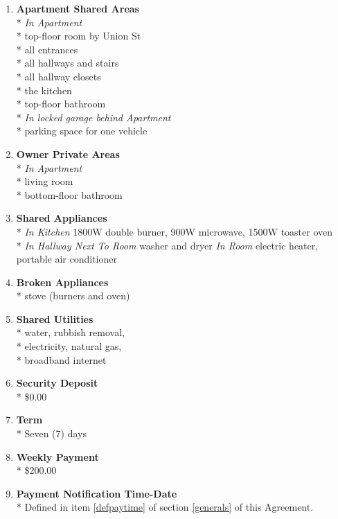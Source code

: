 \documentclass[12pt,letterpaper]{article}
\newcommand{\apt}{Apartment}
\newcommand{\room}{Room}
\newcommand{\shared}{Apartment Shared Areas}
\newcommand{\livingroom}{Owner Private Areas}
\newcommand{\appliances}{Shared Appliances}
\newcommand{\broken}{Broken Appliances}
\newcommand{\utilities}{Shared Utilities}
\newcommand{\deposit}{Security Deposit}
\newcommand{\rent}{Weekly Payment}
\newcommand{\paymenttime}{Payment Notification Time-Date}
\begin{document}
\begin{multicols}{2}
\begin{enumerate}
		\item \textbf{\shared{}}\\* \label{shared}
			\textit{In \apt{}}\\*
			top-floor room by Union St\\*
			all entrances\\*
			all hallways and stairs\\*
			all hallway closets\\*
			the kitchen\\*
			top-floor bathroom\\*
			\textit{In locked garage behind \apt{}}\\*
			parking space for one vehicle
			
		\item \textbf{\livingroom{}}\\* \label{livingroom}
			\textit{In \apt{}}\\*
			living room\\*
			bottom-floor bathroom
			
		\item \textbf{\appliances}\\* \label{appliances}
			\textit{In Kitchen} 1800W double burner,
			900W microwave,
			1500W toaster oven\\*
			\textit{In Hallway Next To \room{}} washer and dryer
			\textit{In \room{}} electric heater,
			portable air conditioner
			
		\item \textbf{\broken{}}\\* \label{broken}
			stove (burners and oven)

		\item \textbf{\utilities{}}\\* \label{utilities}
			water,
			rubbish removal,\\*
			electricity,
			natural gas,\\*
			broadband internet

		\item \textbf{\deposit{}}\\* \label{deposit}
			\$0.00

		\item \textbf{Term}\\*
			Seven (7) days

		\item \textbf{\rent{}}\\* \label{rent}
			\$200.00

		\item \textbf{\paymenttime{}}\\* \label{paymenttime}
			Defined in item \ref{defpaytime} of section \ref{generals} of this Agreement.


\end{enumerate}
\end{multicols}
\end{document}
